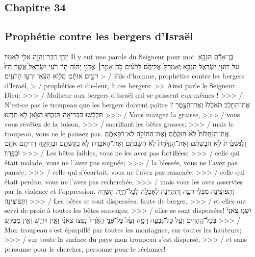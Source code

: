 \begin{paracol}[1]
  \section*{Chapitre 34}
  \subsection*{Prophétie contre les bergers d'Israël}
  \verset
  {וַיְהִ֥י דְבַר־יְהוָ֖ה אֵלַ֥י לֵאמֹֽר׃}
  {Il y eut une parole du Seigneur pour moi:}
  \verset
  {בֶּן־אָדָ֕ם הִנָּבֵ֖א עַל־רוֹעֵ֣י יִשְׂרָאֵ֑ל
    הִנָּבֵ֣א וְאָמַרְתָּ֩ אֲלֵיהֶ֙ם לָרֹעִ֜ים
    כֹּ֥ה אָמַ֣ר׀ אֲדֹנָ֣י יְהוִ֗ה
    ה֤וֹי רֹעֵֽי־יִשְׂרָאֵל֙ אֲשֶׁ֤ר הָיוּ֙ רֹעִ֣ים אוֹתָ֔ם
    הֲל֣וֹא הַצֹּ֔אן יִרְע֖וּ הָרֹעִֽים׃}
  {> / Fils d’homme, prophétise contre les bergers d’Israël,
    > / prophétise et dis-leur, à ces bergers:
    >> Ainsi parle le Seigneur Dieu:
    >>> / Malheur aux bergers d’Israël qui se paissent eux-mêmes !
    >>> / N’est-ce pas le troupeau que les bergers doivent paître ?}
  \verset
  {אֶת־הַחֵ֤לֶב תֹּאכֵ֙לוּ֙
    וְאֶת־הַצֶּ֣מֶר תִּלְבָּ֔שׁוּ
    הַבְּרִיאָ֖ה תִּזְבָּ֑חוּ
    הַצֹּ֖אן לֹ֥א תִרְעֽוּ׃}
  {>>> / Vous mangez la graisse,
    >>> / vous vous revêtez de la toison,
    >>> / sacrifiant les bêtes grasses;
    >>> / mais le troupeau, vous ne le paissez pas.}
  \verset
  {אֶֽת־הַנַּחְלוֹת֩ לֹ֙א חִזַּקְתֶּ֜ם
    וְאֶת־הַחוֹלָ֣ה לֹֽא־רִפֵּאתֶ֗ם
    וְלַנִּשְׁבֶּ֙רֶת֙ לֹ֣א חֲבַשְׁתֶּ֔ם
    וְאֶת־הַנִּדַּ֙חַת֙ לֹ֣א הֲשֵׁבֹתֶ֔ם
    וְאֶת־הָאֹבֶ֖דֶת לֹ֣א בִקַּשְׁתֶּ֑ם
    וּבְחָזְקָ֛ה רְדִיתֶ֥ם אֹתָ֖ם וּבְפָֽרֶךְ׃}
  {>>> / Les bêtes faibles, vous ne les avez pas fortifiées;
    >>> / celle qui était malade, vous ne l'avez pas soignée;
    >>> / la blessée, vous ne l'avez pas pansée;
    >>> / celle qui s’écartait, vous ne l’avez pas ramenée;
    >>> / celle qui était perdue, vous ne l’avez pas recherchée,
    >>> / mais vous les avez asservies par la violence et l’oppression.}
  \verset
  {וַתְּפוּצֶ֖ינָה מִבְּלִ֣י רֹעֶ֑ה
    וַתִּהְיֶ֧ינָה לְאָכְלָ֛ה לְכָל־חַיַּ֥ת הַשָּׂדֶ֖ה
    וַתְּפוּצֶֽינָה׃}
  {>>> / Les bêtes se sont dispersées, faute de berger,
    >>> / et elles ont servi de proie à toutes les bêtes sauvages;
    >>> / elles se sont dispersées!}
  \verset
  {יִשְׁגּ֤וּ צֹאנִי֙ בְּכָל־הֶ֣הָרִ֔ים וְעַ֖ל כָּל־גִּבְעָ֣ה רָמָ֑ה
    וְעַ֙ל כָּל־פְּנֵ֤י הָאָ֙רֶץ֙ נָפֹ֣צוּ צֹאנִ֔י
    וְאֵ֥ין דּוֹרֵ֖שׁ וְאֵ֥ין מְבַקֵּֽשׁ׃}
  {>>> / Mon troupeau s’est éparpillé par toutes les montagnes, sur toutes les hauteurs;
    >>> / sur toute la surface du pays mon troupeau s’est dispersé,
    >>> / et sans personne pour le chercher, personne pour le réclamer!}

\end{paracol}
